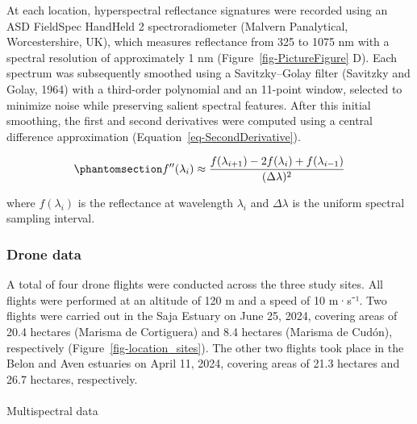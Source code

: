 \documentclass[
  letterpaper,
  DIV=11,
  numbers=noendperiod]{scrartcl}
\makeatletter
\let\oldparagraph\paragraph
\renewcommand{\paragraph}{
    \@ifstar
      \xxxParagraphStar
      \xxxParagraphNoStar
  }
\newcommand{\xxxParagraphStar}[1]{\oldparagraph*{#1}\mbox{}}
\newcommand{\xxxParagraphNoStar}[1]{\oldparagraph{#1}\mbox{}}
\makeatother
\begin{document}
At each location, hyperspectral reflectance signatures were recorded
using an ASD FieldSpec HandHeld 2 spectroradiometer (Malvern
Panalytical, Worcestershire, UK), which measures reflectance from 325 to
1075 nm with a spectral resolution of approximately 1 nm
(Figure~\ref{fig-PictureFigure} D). Each spectrum was subsequently
smoothed using a Savitzky--Golay filter (Savitzky and Golay, 1964) with
a third-order polynomial and an 11-point window, selected to minimize
noise while preserving salient spectral features. After this initial
smoothing, the first and second derivatives were computed using a
central difference approximation (Equation~\ref{eq-SecondDerivative}).

\begin{equation}\phantomsection\label{eq-SecondDerivative}{
f''(\lambda_i) \approx \frac{f(\lambda_{i+1}) - 2f(\lambda_i) + f(\lambda_{i-1})}{(\Delta \lambda)^2}
}\end{equation}

where \(f(\lambda_i)\) is the reflectance at wavelength \(\lambda_i\)
and \(\Delta \lambda\) is the uniform spectral sampling interval.

\subsubsection{Drone data}\label{drone-data}

A total of four drone flights were conducted across the three study
sites. All flights were performed at an altitude of 120 m and a speed of
10 m·s⁻¹. Two flights were carried out in the Saja Estuary on June 25,
2024, covering areas of 20.4 hectares (Marisma de Cortiguera) and 8.4
hectares (Marisma de Cudón), respectively
(Figure~\ref{fig-location_sites}). The other two flights took place in
the Belon and Aven estuaries on April 11, 2024, covering areas of 21.3
hectares and 26.7 hectares, respectively.

\paragraph{Multispectral data}\label{sec-photo}
\end{document}
